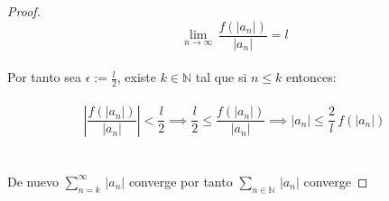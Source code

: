 \documentclass[11pt,letterpaper]{article}
\newcommand{\N}{\mathbb{N}}
\begin{document}
\begin{proof}
    \begin{equation*}
        \lim_{n\rightarrow \infty}\,\frac{f(|a_n|)}{|a_n|}=l
    \end{equation*}\,\\
    Por tanto sea $\epsilon:=\frac{l}{2}$, existe $k\in \N$ tal que si $n\leq k$ entonces:\,\\
    \,\\
    \begin{equation*}
        \left|\frac{f(|a_n|)}{|a_n|}\right|<\frac{l}{2}\implies \frac{l}{2}\leq \frac{f(|a_n|)}{|a_n|}\implies |a_n|\leq \frac{2}{l}\,f(|a_n|)
    \end{equation*}\,\\
    \,\\
    De nuevo $\sum_{n=k}^{\infty}\,|a_n|$ converge por tanto $\sum_{n\in \N}\,|a_n|$ converge
    
\end{proof}
\end{document}
